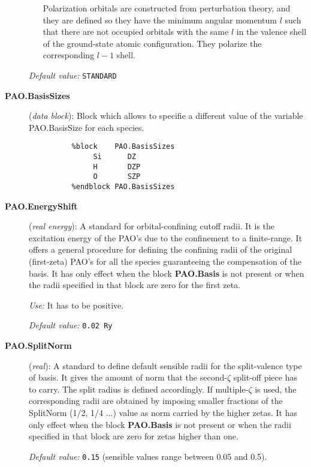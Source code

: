 \begin{description}
\begin{itemize}
Polarization orbitals are constructed from 
perturbation theory, 
and they are defined so they have 
the minimum angular momentum $l$ such that there are not occupied orbitals
with the same $l$ in the valence shell of the ground-state atomic 
configuration. They polarize the corresponding $l-1$ shell. 
\end{itemize}

{\it Default value:} {\tt STANDARD}

\item[{\bf PAO.BasisSizes}]({\it data block}): 
Block which allows to specifie a different value of the variable 
PAO.BasisSize for each species. 
\begin{verbatim}
          %block    PAO.BasisSizes
               Si      DZ
               H       DZP
               O       SZP 
          %endblock PAO.BasisSizes
\end{verbatim} 


\item[{\bf PAO.EnergyShift}] ({\it real energy}): A standard for 
orbital-confining cutoff radii. It is the excitation energy
of the PAO's due to the confinement to a finite-range. It offers a
general procedure for defining the confining radii of the original
(first-zeta) PAO's for all the species guaranteeing the compensation 
of the basis. It has only effect when the block
{\bf PAO.Basis} is not present or when the radii
specified in that block are zero for the first zeta.

{\it Use:} It has to be positive.

{\it Default value:} {\tt 0.02 Ry}


\item[{\bf PAO.SplitNorm}] ({\it real}): 
A standard to define default sensible
radii for the split-valence type of basis. It gives the amount of norm that
the second-$\zeta$ split-off piece has to carry. The split radius is defined
accordingly. If multiple-$\zeta$ 
is used, the corresponding radii are obtained
by imposing smaller fractions of the SplitNorm (1/2, 1/4 ...) value as
norm carried by the higher zetas. It has only effect when the block
{\bf PAO.Basis} is not present or when the radii
specified in that block are zero for zetas higher than one.

{\it Default value:} {\tt 0.15} (sensible values range between 0.05 and 0.5).



\end{description}
